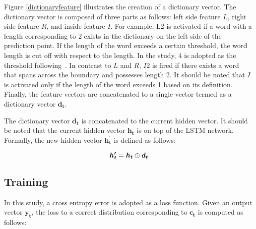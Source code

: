 \documentclass[11pt,letterpaper]{article}
\begin{document}
Figure \ref{dictionaryfeature} illustrates the creation of a dictionary vector.
The dictionary vector is composed of three parts as follows: left side feature $L$, right side feature $R$, and inside feature $I$. For example, L2 is activated if a word with a length corresponding to 2 exists in the dictionary on the left side of the prediction point. If the length of the word exceeds a certain threshold, the word length is cut off with respect to the length. In the study, 4 is adopted as the threshold following~.
In contrast to $L$ and $R$, 
$I2$ is fired if there exists a word that spans across the boundary and possesses length 2. It should be noted that $I$ is activated only if the length of the word exceeds 1  based on its definition.
Finally, the feature vectors are concatenated to a single vector termed as a dictionary vector $\bm{d_{t}}$.

The dictionary vector $\bm{d_{t}}$ is concatenated to the current hidden vector. 
It should be noted that the current hidden vector $\bm{h_{t}}$ is on top of the LSTM network.
Formally, the new hidden vector $\bm{h^{\prime}_{t}}$ is defined as follows:

\begin{equation}  
\bm{h^{\prime}_{t}} = \bm{h_{t}} \oplus \bm{d_{t}}
\vspace{6pt}
 \end{equation}






\subsection{Training}
In this study, a cross entropy error is adopted as a loss function. Given an output vector $\bm{y_{t}}$, the loss to a correct distribution corresponding to $\bm{c_{t}}$ is computed as follows:
\end{document}

